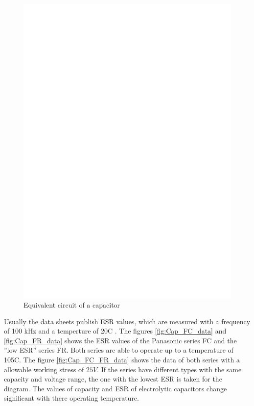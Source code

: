 \begin{figure}[H]
  \centering
    \includegraphics[]{../FIG/Cap_equiv.eps}
  \caption{Equivalent circuit of a capacitor}
  \label{fig:Cap_equiv}
\end{figure}

Usually the data sheets publish ESR values, which are measured with a frequency of 100 kHz and a temperture 
of 20\textdegree C .
The figures \ref{fig:Cap_FC_data} and \ref{fig:Cap_FR_data} shows the ESR values of the Panasonic series FC and 
the ''low ESR'' series FR.
Both series are able to operate up to a temperature of 105\textdegree C.
The figure \ref{fig:Cap_FC_FR_data} shows the data of both series with a allowable working stress of \(25V\).
If the series have different types with the same capacity and voltage range, the one with the lowest ESR is
taken for the diagram.
The values of capacity and ESR of electrolytic capacitors change significant with there operating temperature.

